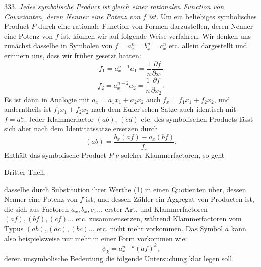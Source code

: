 \documentclass[11pt]{article}
\providecommand{\weberpage}[1]{}
\providecommand{\weq}[2]{\begin{equation}\tag{#1}#2\end{equation}}
\begin{document}
333. \textit{Jedes symbolische Product ist gleich einer rationalen Function von Covarianten, deren Nenner eine Potenz von $f$ ist.} Um ein beliebiges symbolisches Product $P$ durch eine rationale Function von Formen darzustellen, deren Nenner eine Potenz von $f$ ist, können wir auf folgende Weise verfahren. Wir denken uns zunächst dasselbe in Symbolen von $f = a_x^n = b_x^n = c_x^n$ etc. allein dargestellt und erinnern uns, dass wir früher gesetzt hatten:
\[
f_1 = a_x^{n-1}a_1 = \frac{1}{n}\frac{\partial f}{\partial x_1}
\]
\[
f_2 = a_x^{n-2}a_2 = \frac{1}{n}\frac{\partial f}{\partial x_2}.
\]
Es ist dann in Analogie mit $a_x = a_1x_1 + a_2x_2$ auch $f_x = f_1x_1 + f_2x_2$, und anderntheils ist $f_1x_1 + f_2x_2$ nach dem Euler'schen Satze auch identisch mit $f = a_x^n$. Jeder Klammerfactor $(ab)$, $(cd)$ etc. des symbolischen Products lässt sich aber nach dem Identitätssatze ersetzen durch
\weq{1}{
(ab) = \frac{b_x(af) - a_x(bf)}{f_x}.
}
Enthält das symbolische Product $P$ $\nu$ solcher Klammerfactoren, so geht


\weberpage{356}
Dritter Theil.

dasselbe durch Substitution ihrer Werthe (1) in einen Quotienten über, dessen Nenner eine Potenz von $f$ ist, und dessen Zähler ein Aggregat von Producten ist, die sich aus Factoren $a_x, b_x, c_x \ldots$ erster Art, und Klammerfactoren $(af), (bf), (cf) \ldots$ etc. zusammensetzen, während Klammerfactoren vom Typus $(ab), (ac), (bc) \ldots$ etc. nicht mehr vorkommen. Das Symbol $a$ kann also beispielsweise nur mehr in einer Form vorkommen wie:
\weq{2}{
\psi_k = a_x^{n-k}(af)^k,
}
deren unsymbolische Bedeutung die folgende Untersuchung klar legen soll.
\end{document}

